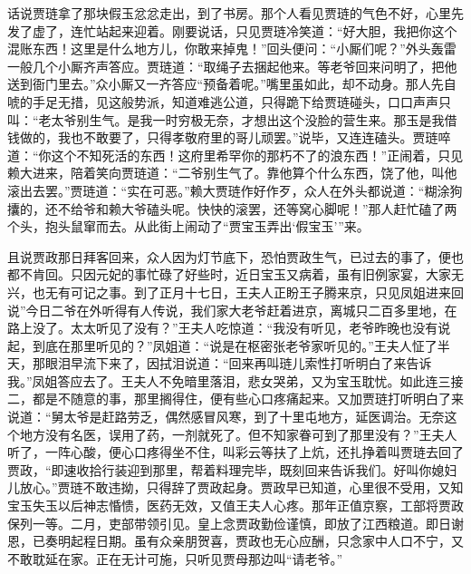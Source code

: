 

\begin{parag}
    话说贾琏拿了那块假玉忿忿走出，到了书房。那个人看见贾琏的气色不好，心里先发了虚了，连忙站起来迎着。刚要说话，只见贾琏冷笑道：“好大胆，我把你这个混账东西！这里是什么地方儿，你敢来掉鬼！”回头便问：“小厮们呢？”外头轰雷一般几个小厮齐声答应。贾琏道：“取绳子去捆起他来。等老爷回来问明了，把他送到衙门里去。”众小厮又一齐答应“预备着呢。”嘴里虽如此，却不动身。那人先自唬的手足无措，见这般势派，知道难逃公道，只得跪下给贾琏碰头，口口声声只叫：“老太爷别生气。是我一时穷极无奈，才想出这个没脸的营生来。那玉是我借钱做的，我也不敢要了，只得孝敬府里的哥儿顽罢。”说毕，又连连磕头。贾琏啐道：“你这个不知死活的东西！这府里希罕你的那朽不了的浪东西！”正闹着，只见赖大进来，陪着笑向贾琏道：“二爷别生气了。靠他算个什么东西，饶了他，叫他滚出去罢。”贾琏道：“实在可恶。”赖大贾琏作好作歹，众人在外头都说道：“糊涂狗攮的，还不给爷和赖大爷磕头呢。快快的滚罢，还等窝心脚呢！”那人赶忙磕了两个头，抱头鼠窜而去。从此街上闹动了“贾宝玉弄出‘假宝玉’”来。
\end{parag}


\begin{parag}
    且说贾政那日拜客回来，众人因为灯节底下，恐怕贾政生气，已过去的事了，便也都不肯回。只因元妃的事忙碌了好些时，近日宝玉又病着，虽有旧例家宴，大家无兴，也无有可记之事。到了正月十七日，王夫人正盼王子腾来京，只见凤姐进来回说”今日二爷在外听得有人传说，我们家大老爷赶着进京，离城只二百多里地，在路上没了。太太听见了没有？”王夫人吃惊道：“我没有听见，老爷昨晚也没有说起，到底在那里听见的？”凤姐道：“说是在枢密张老爷家听见的。”王夫人怔了半天，那眼泪早流下来了，因拭泪说道：“回来再叫琏儿索性打听明白了来告诉我。”凤姐答应去了。王夫人不免暗里落泪，悲女哭弟，又为宝玉耽忧。如此连三接二，都是不随意的事，那里搁得住，便有些心口疼痛起来。又加贾琏打听明白了来说道：“舅太爷是赶路劳乏，偶然感冒风寒，到了十里屯地方，延医调治。无奈这个地方没有名医，误用了药，一剂就死了。但不知家眷可到了那里没有？”王夫人听了，一阵心酸，便心口疼得坐不住，叫彩云等扶了上炕，还扎挣着叫贾琏去回了贾政，“即速收拾行装迎到那里，帮着料理完毕，既刻回来告诉我们。好叫你媳妇儿放心。”贾琏不敢违拗，只得辞了贾政起身。贾政早已知道，心里很不受用，又知宝玉失玉以后神志惛愦，医药无效，又值王夫人心疼。那年正值京察，工部将贾政保列一等。二月，吏部带领引见。皇上念贾政勤俭谨慎，即放了江西粮道。即日谢恩，已奏明起程日期。虽有众亲朋贺喜，贾政也无心应酬，只念家中人口不宁，又不敢耽延在家。正在无计可施，只听见贾母那边叫“请老爷。”
\end{parag}


